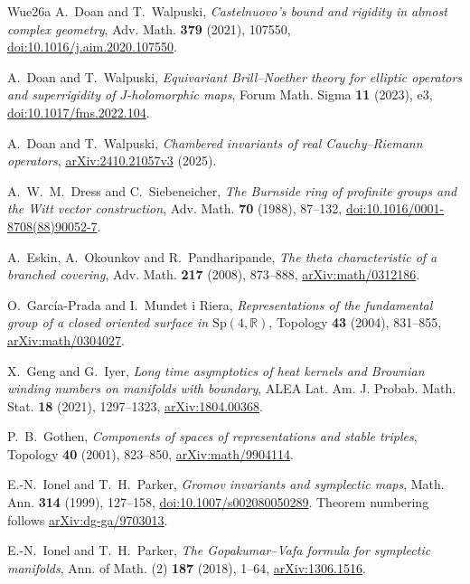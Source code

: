 \begin{thebibliography}{Wue26a}
 A.~Doan and T.~Walpuski,
\emph{Castelnuovo's bound and rigidity in almost complex geometry},
Adv. Math. \textbf{379} (2021), 107550,
\href{https://doi.org/10.1016/j.aim.2020.107550}{doi:10.1016/j.aim.2020.107550}.

 A.~Doan and T.~Walpuski,
\emph{Equivariant Brill--Noether theory for elliptic operators and superrigidity of
$J$-holomorphic maps}, Forum Math. Sigma \textbf{11} (2023), e3,
\href{https://doi.org/10.1017/fms.2022.104}{doi:10.1017/fms.2022.104}.

 A.~Doan and T.~Walpuski,
\emph{Chambered invariants of real Cauchy--Riemann operators},
\href{https://arxiv.org/abs/2410.21057v3}{arXiv:2410.21057v3} (2025).

 A.~W.~M.~Dress and C.~Siebeneicher,
\emph{The Burnside ring of profinite groups and the Witt vector construction},
Adv. Math. \textbf{70} (1988), 87--132,
\href{https://doi.org/10.1016/0001-8708(88)90052-7}{doi:10.1016/0001-8708(88)90052-7}.

 A.~Eskin, A.~Okounkov and R.~Pandharipande, \emph{The theta characteristic of a branched covering}, Adv. Math. \textbf{217} (2008), 873--888, \href{https://arxiv.org/abs/math/0312186}{arXiv:math/0312186}.

 O.~Garc\'ia-Prada and I.~Mundet i Riera, \emph{Representations of the fundamental group of a closed oriented surface in $\mathrm{Sp}(4,\mathbb R)$}, Topology \textbf{43} (2004), 831--855, \href{https://arxiv.org/abs/math/0304027}{arXiv:math/0304027}.

 X.~Geng and G.~Iyer,
\emph{Long time asymptotics of heat kernels and Brownian winding
numbers on manifolds with boundary}, ALEA Lat. Am. J. Probab. Math.
Stat. \textbf{18} (2021), 1297--1323,
\href{https://arxiv.org/abs/1804.00368}{arXiv:1804.00368}.

 P.~B.~Gothen, \emph{Components of spaces of representations and stable triples}, Topology \textbf{40} (2001), 823--850, \href{https://arxiv.org/abs/math/9904114}{arXiv:math/9904114}.

 E.-N.~Ionel and T.~H.~Parker, \emph{Gromov invariants and
symplectic maps}, Math. Ann. \textbf{314} (1999), 127--158,
\href{https://doi.org/10.1007/s002080050289}{doi:10.1007/s002080050289}.
Theorem numbering follows \href{https://arxiv.org/abs/dg-ga/9703013}{arXiv:dg-ga/9703013}.

 E.-N.~Ionel and T.~H.~Parker,
\emph{The Gopakumar--Vafa formula for symplectic manifolds},
Ann. of Math. (2) \textbf{187} (2018), 1--64,
\href{https://arxiv.org/abs/1306.1516}{arXiv:1306.1516}.


\end{thebibliography}
